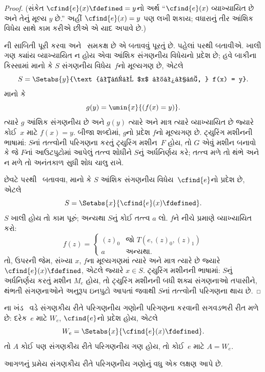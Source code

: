 \begin{proof}
(સંકેત $\cfind{e}(x) \fdefined = y$નો અર્થ
``$\cfind{e}(x)$ વ્યાખ્યાયિત છે અને તેનું મૂલ્ય $y$ છે.''
અહીં $\cfind{e}(x) = y$ પણ લખી શકાય; વધારાનું તીર
આંશિક વિધેય સાથે કામ કરીએ છીએ એ યાદ અપાવે છે.)

ની સાબિતી પૂરી કરવા
 અને~ સમકક્ષ છે એ
બતાવવું પૂરતું છે. પહેલાં  પરથી
 બતાવીએ. ખાલી ગણ ક્યાંય વ્યાખ્યાયિત
ન હોય એવા આંશિક સંગણનીય વિધેયનો પ્રદેશ છે; હવે બાકીના
કિસ્સામાં માનો કે $S$ સંગણનીય વિધેય~$f$નો મૂલ્યગણ છે, એટલે
\[
S = \Setabs{y}{\text{કોઈ $x$ માટે, } f(x) = y}.
\]
માનો કે
\[
g(y) = \umin{x}{(f(x) = y)}.
\]
ત્યારે $g$ આંશિક સંગણનીય છે અને $g(y)$ ત્યારે અને માત્ર
ત્યારે વ્યાખ્યાયિત છે જ્યારે કોઈ~$x$ માટે $f(x) = y$.
બીજા શબ્દોમાં, $g$નો પ્રદેશ $f$નો મૂલ્યગણ છે.
ટ્યુરિંગ મશીનની ભાષામાં: $S$નાં તત્ત્વોની
પરિગણના કરતું ટ્યુરિંગ મશીન~$F$ હોય, તો $G$ એવું મશીન
બનાવો કે જે $F$નાં આઉટપુટોમાં આપેલું તત્ત્વ શોધીને $S$નું
અર્ધનિર્ણય કરે; તત્ત્વ મળે તો થંભે અને ન મળે તો અનંતકાળ સુધી
શોધ ચાલુ રાખે.

છેવટે  પરથી~
બતાવવા, માનો કે $S$ આંશિક સંગણનીય વિધેય~$\cfind{e}$નો
પ્રદેશ છે, એટલે
\[
S = \Setabs{x}{\cfind{e}(x) \fdefined}.
\]
$S$ ખાલી હોય તો કામ પૂરું; અન્યથા $S$નું કોઈ તત્ત્વ $a$
લો. $f$ને નીચે પ્રમાણે વ્યાખ્યાયિત કરો:
\[
f(z) = \begin{cases}
(z)_0 & \text{જો $T(e,(z)_0,(z)_1)$} \\
a & \text{અન્યથા.}
\end{cases}
\]
તો, ઉપરની જેમ, સંખ્યા $x$, $f$ના મૂલ્યગણમાં ત્યારે અને
માત્ર ત્યારે છે જ્યારે $\cfind{e}(x) \fdefined$, એટલે જ્યારે
$x \in S$. ટ્યુરિંગ મશીનની ભાષામાં:
$S$નું અર્ધનિર્ણય કરતું મશીન $M_e$ હોય, તો ટ્યુરિંગ મશીનની
બધી શક્ય સંગણનાઓ તપાસીને, થંભતી સંગણનાઓને અનુરૂપ
ઇનપુટો આપતાં જવાથી $S$નાં તત્ત્વોની પરિગણના થાય છે.
\end{proof}

ના ખંડ~ વડે
સંગણકીય રીતે પરિગણનીય ગણોની પરિગણના કરવાની સગવડભરી રીત
મળે છે: દરેક~$e$ માટે $W_e$, $\cfind{e}$નો પ્રદેશ હોય, એટલે
\[
W_e = \Setabs{x}{\cfind{e}(x) \fdefined}.
\]
તો $A$ કોઈ પણ સંગણકીય રીતે પરિગણનીય ગણ હોય, તો કોઈ~$e$
માટે $A = W_e$.

આગળનું પ્રમેય સંગણકીય રીતે પરિગણનીય ગણોનું વધુ એક લક્ષણ આપે છે.

